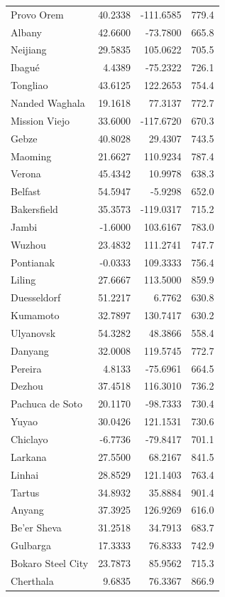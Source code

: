 \begin{longtable}{lrrc}
Provo Orem & 40.2338 & -111.6585 & 779.4 \\
Albany & 42.6600 & -73.7800 & 665.8 \\
Neijiang & 29.5835 & 105.0622 & 705.5 \\
Ibagué & 4.4389 & -75.2322 & 726.1 \\
Tongliao & 43.6125 & 122.2653 & 754.4 \\
Nanded Waghala & 19.1618 & 77.3137 & 772.7 \\
Mission Viejo & 33.6000 & -117.6720 & 670.3 \\
Gebze & 40.8028 & 29.4307 & 743.5 \\
Maoming & 21.6627 & 110.9234 & 787.4 \\
Verona & 45.4342 & 10.9978 & 638.3 \\
Belfast & 54.5947 & -5.9298 & 652.0 \\
Bakersfield & 35.3573 & -119.0317 & 715.2 \\
Jambi & -1.6000 & 103.6167 & 783.0 \\
Wuzhou & 23.4832 & 111.2741 & 747.7 \\
Pontianak & -0.0333 & 109.3333 & 756.4 \\
Liling & 27.6667 & 113.5000 & 859.9 \\
Duesseldorf & 51.2217 & 6.7762 & 630.8 \\
Kumamoto & 32.7897 & 130.7417 & 630.2 \\
Ulyanovsk & 54.3282 & 48.3866 & 558.4 \\
Danyang & 32.0008 & 119.5745 & 772.7 \\
Pereira & 4.8133 & -75.6961 & 664.5 \\
Dezhou & 37.4518 & 116.3010 & 736.2 \\
Pachuca de Soto & 20.1170 & -98.7333 & 730.4 \\
Yuyao & 30.0426 & 121.1531 & 730.6 \\
Chiclayo & -6.7736 & -79.8417 & 701.1 \\
Larkana & 27.5500 & 68.2167 & 841.5 \\
Linhai & 28.8529 & 121.1403 & 763.4 \\
Tartus & 34.8932 & 35.8884 & 901.4 \\
Anyang & 37.3925 & 126.9269 & 616.0 \\
Be'er Sheva & 31.2518 & 34.7913 & 683.7 \\
Gulbarga & 17.3333 & 76.8333 & 742.9 \\
Bokaro Steel City & 23.7873 & 85.9562 & 715.3 \\
Cherthala & 9.6835 & 76.3367 & 866.9 \\

\end{longtable}
